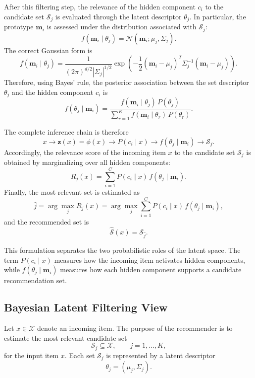 \documentclass{article}
\begin{document}
After this filtering step, the relevance of the hidden component \(c_i\) to the candidate set \(\mathcal{S}_j\) is evaluated through the latent descriptor \(\theta_j\). In particular, the prototype \(\mathbf{m}_i\) is assessed under the distribution associated with \(\mathcal{S}_j\):
\[
f(\mathbf{m}_i\mid \theta_j)
=
\mathcal{N}(\mathbf{m}_i;\mu_j,\Sigma_j).
\]
The correct Gaussian form is
\[
f(\mathbf{m}_i\mid \theta_j)
=
\frac{1}{(2\pi)^{d/2}|\Sigma_j|^{1/2}}
\exp\left(
-\frac{1}{2}
(\mathbf{m}_i-\mu_j)^T
\Sigma_j^{-1}
(\mathbf{m}_i-\mu_j)
\right).
\]
Therefore, using Bayes' rule, the posterior association between the set descriptor \(\theta_j\) and the hidden component \(c_i\) is
\[
f(\theta_j\mid \mathbf{m}_i)
=
\frac{
	f(\mathbf{m}_i\mid \theta_j)\,P(\theta_j)
}{
	\sum_{r=1}^{K}
	f(\mathbf{m}_i\mid \theta_r)\,P(\theta_r)
}.
\]

The complete inference chain is therefore
\[
x
\longrightarrow
\mathbf{z}(x)=\phi(x)
\longrightarrow
P(c_i\mid x)
\longrightarrow
f(\theta_j\mid \mathbf{m}_i)
\longrightarrow
\mathcal{S}_j .
\]
Accordingly, the relevance score of the incoming item \(x\) to the candidate set \(\mathcal{S}_j\) is obtained by marginalizing over all hidden components:
\[
R_j(x)
=
\sum_{i=1}^{C}
P(c_i\mid x)\,
f(\theta_j\mid \mathbf{m}_i).
\]
Finally, the most relevant set is estimated as
\[
\widehat{j}
=
\arg\max_{j}
R_j(x)
=
\arg\max_{j}
\sum_{i=1}^{C}
P(c_i\mid x)\,
f(\theta_j\mid \mathbf{m}_i),
\]
and the recommended set is
\[
\widehat{\mathcal{S}}(x)=\mathcal{S}_{\widehat{j}}.
\]

This formulation separates the two probabilistic roles of the latent space. The term \(P(c_i\mid x)\) measures how the incoming item activates hidden components, while \(f(\theta_j\mid \mathbf{m}_i)\) measures how each hidden component supports a candidate recommendation set.








\subsection{Bayesian Latent Filtering View}
\label{subsec:bayesian_latent_filtering_view}

Let \(x\in\mathcal{X}\) denote an incoming item. The purpose of the recommender is to estimate the most relevant candidate set
\[
\mathcal{S}_j\subseteq\mathcal{X},
\qquad j=1,\ldots,K,
\]
for the input item \(x\). Each set \(\mathcal{S}_j\) is represented by a latent descriptor
\[
\theta_j=(\mu_j,\Sigma_j).
\]
\end{document}
